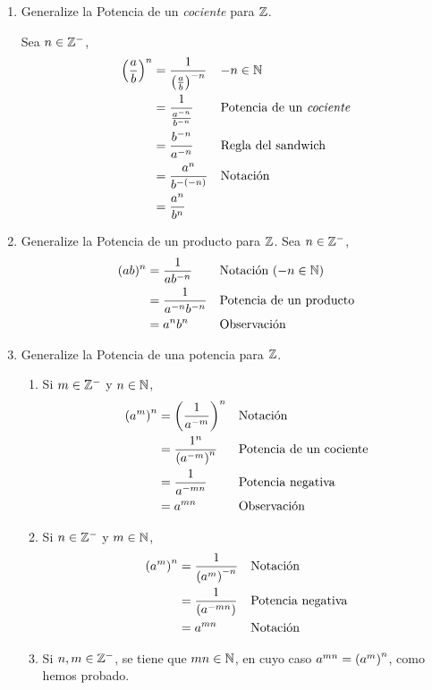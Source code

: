 \begin{enumerate}[label=\alph*)]
  \item Generalize la Potencia de un \textit{cociente} para $\mathbb{Z}$.
  
  Sea $n\in \mathbb{Z}^-$,
    \begin{align*}
      \left(\frac{a}{b}\right)^n &= \frac{1}{\left(\frac{a}{b}\right)^{-n}} && \text{$-n\in \mathbb{N}$}\\
      &= \frac{1}{\frac{a^{-n}}{b^{-n}}} && \text{Potencia de un \textit{cociente}}\\
      &= \frac{b^{-n}}{a^{-n}} && \text{Regla del sandwich}\\
      &= \frac{a^n}{b^{-(-n)}} && \text{Notación}\\
      &= \frac{a^n}{b^n}
    \end{align*}
    
  \item Generalize la Potencia de un producto para $\mathbb{Z}$.
  Sea $n\in \mathbb{Z}^-$,
  \begin{align*}
    (ab)^n &= \frac{1}{ab^{-n}} && \text{Notación ($-n\in \mathbb{N}$)}\\
    &= \frac{1}{a^{-n}b^{-n}} && \text{Potencia de un producto}\\
    &= a^nb^n && \text{Observación}
  \end{align*}
  
  \item Generalize la Potencia de una potencia para $\mathbb{Z}$.
  \begin{enumerate}[label=\roman*)]
    \item Si $m\in \mathbb{Z}^-$ y $n\in \mathbb{N}$,
    \begin{align*}
      \qty(a^{m})^n &= \left(\frac{1}{a^{-m}}\right)^n && \text{Notación}\\
      &= \frac{1^n}{\qty(a^{-m})^n} && \text{Potencia de un cociente}\\
      &= \frac{1}{a^{-mn}} && \text{Potencia negativa}\\
      &= a^{mn} && \text{Observación}
    \end{align*}
    \item Si $n\in \mathbb{Z}^-$ y $m\in \mathbb{N}$,
    \begin{align*}
      \qty(a^m)^n &= \frac{1}{\qty(a^m)^{-n}} && \text{Notación}\\
      &= \frac{1}{\qty(a^{-mn})} && \text{Potencia negativa}\\
      &= a^{mn} && \text{Notación}
    \end{align*}
    \item Si $n,m\in \mathbb{Z}^-$, se tiene que $mn\in \mathbb{N}$, en cuyo caso $a^{mn}= \qty(a^m)^n$, como hemos probado.
  \end{enumerate}
    

\end{enumerate}
